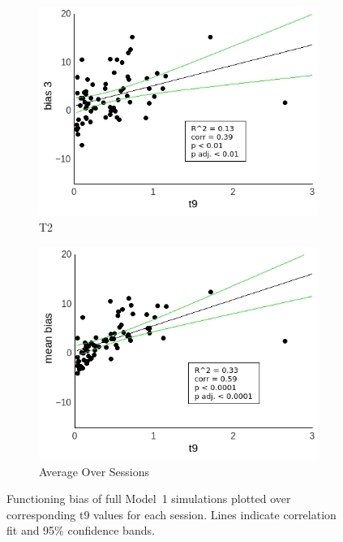 \documentclass[a4paper]{scrreprt}
\begin{document}
\begin{figure}
\begin{subfigure}[b]{0.49\textwidth}
        \includegraphics[width=\textwidth]{figs/sec3/t9/t9_diff_3_mod1mod1.jpeg}
        \caption{T2}
    \end{subfigure}
    \begin{subfigure}[b]{0.49\textwidth}
        \includegraphics[width=\textwidth]{figs/sec3/t9/t9_diff_mean_mod1mod1.jpeg}
        \caption{Average Over Sessions}
    \end{subfigure}
\caption{Functioning bias of full Model~1 simulations plotted over corresponding t9 values for each session. Lines indicate correlation fit and 95\% confidence bands.}
\label{fig:t9_diff_mod1mod1}
\end{figure}
\end{document}
